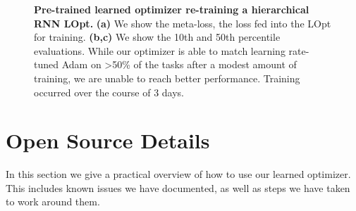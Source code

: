 \documentclass[11pt]{article}
\begin{document}
\begin{figure}[t!]
    \centering
    \caption{\textbf{Pre-trained learned optimizer re-training a hierarchical RNN LOpt.} \textbf{(a)} We show the meta-loss, the loss fed into the LOpt for training. \textbf{(b,c)} We show the 10th and 50th percentile evaluations. While our optimizer is able to match learning rate-tuned Adam on >50\% of the tasks after a modest amount of training, we are unable to reach better performance.
    Training occurred over the course of 3 days.
    \label{fig:selfopt_big_mlprnn}
    }
\end{figure}



\section{Open Source Details}
In this section we give a practical overview of how to use our learned optimizer. This includes known issues we have documented, as well as steps we have taken to work around them.
\end{document}
